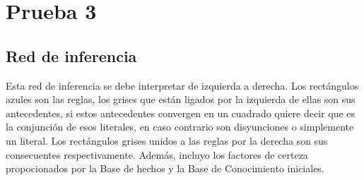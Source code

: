 

\section{Prueba 3}

\subsection{Red de inferencia}
\par Esta red de inferencia se debe interpretar de izquierda a derecha.
Los rectángulos azules son las reglas, los grises que están ligados por la izquierda 
de ellas son sus antecedentes, si estos antecedentes convergen en un cuadrado 
quiere decir que es la conjunción de esos literales, en caso contrario son disyunciones
o simplemente un literal. Los rectángulos grises unidos a las reglas por la derecha
son sus consecuentes respectivamente. Además, incluyo los factores de certeza propocionados por
la Base de hechos y la Base de Conocimiento iniciales.

